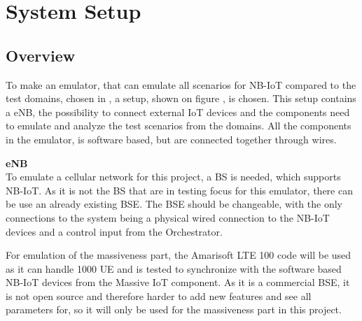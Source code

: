 \chapter{System Setup}

\section{Overview}

To make an emulator, that can emulate all scenarios for NB-IoT compared to the test domains, chosen in , a setup, shown on figure , is chosen. This setup contains a \gls{eNB}, the possibility to connect external IoT devices and the components need to emulate and analyze the test scenarios from the domains. All the components in the emulator, is software based, but are connected together through wires.





\textbf{eNB}\\

To emulate a cellular network for this project, a \gls{BS} is needed, which supports \gls{NB-IoT}. As it is not the BS that are in testing focus for this emulator, there can be use an already existing \gls{BSE}. The BSE should be changeable, with the only connections to the system being a physical wired connection to the NB-IoT devices and a control input from the Orchestrator.

For emulation of the massiveness part, the Amarisoft LTE 100 code will be used as it can handle 1000 \gls{UE}  and is tested to synchronize with the software based NB-IoT devices from the Massive IoT component. As it is a commercial BSE, it is not open source and therefore harder to add new features and see all parameters for, so it will only be used for the massiveness part in this project.

